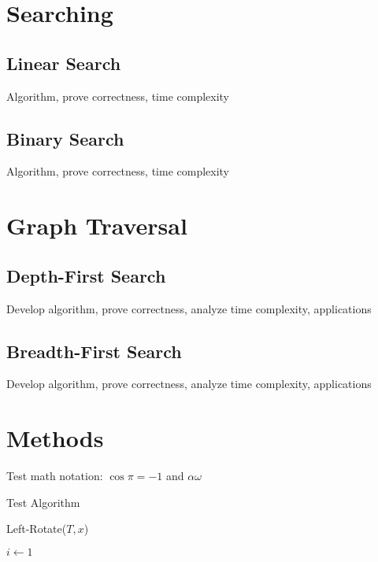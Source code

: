 \documentclass[10pt, 
a4paper, 
oneside, 
headinclude, footinclude, 
BCOR5mm]
{scrartcl}
\begin{document}
\section{Searching}
\subsection{Linear Search}
Algorithm, prove correctness, time complexity
\newpage
\subsection{Binary Search}
Algorithm, prove correctness, time complexity
\newpage

\section{Graph Traversal}
\subsection{Depth-First Search}
Develop algorithm, prove correctness, analyze time complexity, applications
\newpage
\subsection{Breadth-First Search}
Develop algorithm, prove correctness, analyze time complexity, applications
\newpage

\section{Methods}

Test math notation: $\cos\pi=-1$ and $\alpha\omega$

Test Algorithm
\IncMargin{1em}
\begin{algorithm}
    \caption{Left-Rotate($T,x$)}
    \BlankLine

    $i \gets 1$\;

\end{algorithm}\DecMargin{1em}
\end{document}

